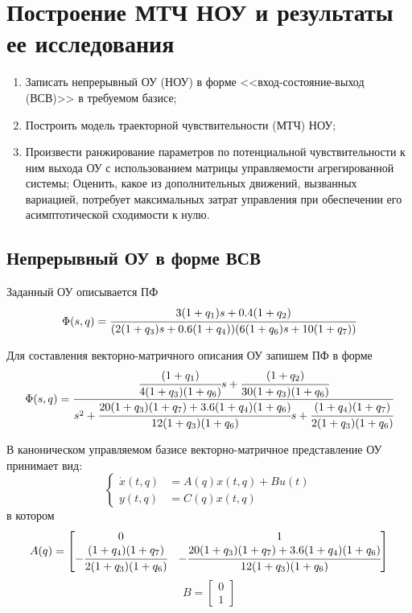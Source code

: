 \section{Построение МТЧ НОУ и результаты ее исследования}\label{problem_1}

\begin{enumerate}
	\item Записать непрерывный ОУ (НОУ) в форме <<вход-состояние-выход (ВСВ)>> в требуемом базисе;
	\item Построить модель траекторной чувствительности (МТЧ) НОУ;
	\item Произвести ранжирование параметров  по потенциальной чувствительности к ним выхода ОУ с использованием матрицы управляемости агрегированной системы;
	Оценить, какое из дополнительных движений, вызванных вариацией, потребует максимальных затрат управления при обеспечении его асимптотической сходимости к нулю.
\end{enumerate}


\subsection{Непрерывный ОУ в форме ВСВ}

Заданный ОУ описывается ПФ
\begin{equation}\label{eq_OU}
\Phi (s, q) = \cfrac{3 (1 + q_1) s + 0.4 (1 + q_2)}{(2 (1+q_3)s + 0.6 (1+q_4))(6 (1 + q_6) s + 10 (1 + q_7))}
\end{equation}

Для составления векторно-матричного описания ОУ запишем ПФ в форме
\begin{equation*}\label{eq_pf_coc}
\Phi (s, q) = \cfrac{\cfrac{(1 + q_1)}{4(1+q_3)(1+q_6)} s + \cfrac{(1 + q_2)}{30(1+q_3)(1+q_6)}}{s^2 + \cfrac{20(1+q_3)(1+q_7)+3.6(1+q_4)(1+q_6)}{12(1+q_3)(1+q_6)} s + \cfrac{(1+q_4)(1+q_7)}{2(1+q_3)(1+q_6)}}
\end{equation*}

В каноническом управляемом базисе векторно-матричное представление ОУ принимает вид:
\begin{equation}\label{eq_iso_coc}
\begin{cases}
\dot x(t,q) &= A(q) x(t,q) + B u(t)\\
y(t,q) &= C(q) x(t,q)
\end{cases}
\end{equation}
в котором
\begin{equation}\label{Aq}
	A(q) =
	\begin{bmatrix}
		0 & 1 \\
		- \cfrac{(1+q_4)(1+q_7)}{2(1+q_3)(1+q_6)} & - \cfrac{20(1+q_3)(1+q_7)+3.6(1+q_4)(1+q_6)}{12(1+q_3)(1+q_6)}
	\end{bmatrix}
\end{equation}
\begin{equation}\label{Bq}
	B =
	\begin{bmatrix}
		0\\
		1
	\end{bmatrix}
\end{equation}

